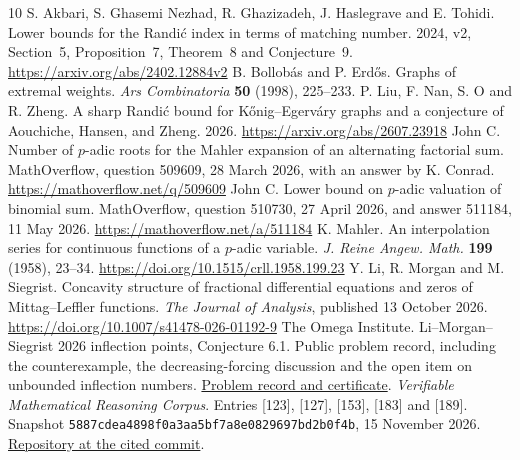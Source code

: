 \documentclass[11pt]{article}
\theoremstyle{remark}\newtheorem{remark}[theorem]{Remark}
\begin{document}
\begin{thebibliography}{10}\small
{} S. Akbari, S. Ghasemi Nezhad, R. Ghazizadeh, J. Haslegrave and E. Tohidi. Lower bounds for the Randi\'c index in terms of matching number. 2024, v2, Section~5, Proposition~7, Theorem~8 and Conjecture~9. \url{https://arxiv.org/abs/2402.12884v2}
 B. Bollob\'as and P. Erd\H{o}s. Graphs of extremal weights. \emph{Ars Combinatoria} \textbf{50} (1998), 225--233.
 P. Liu, F. Nan, S. O and R. Zheng. A sharp Randi\'c bound for K\H{o}nig--Egerv\'ary graphs and a conjecture of Aouchiche, Hansen, and Zheng. 2026. \url{https://arxiv.org/abs/2607.23918}
 John C. Number of $p$-adic roots for the Mahler expansion of an alternating factorial sum. MathOverflow, question 509609, 28 March 2026, with an answer by K. Conrad. \url{https://mathoverflow.net/q/509609}
 John C. Lower bound on $p$-adic valuation of binomial sum. MathOverflow, question 510730, 27 April 2026, and answer 511184, 11 May 2026. \url{https://mathoverflow.net/a/511184}
 K. Mahler. An interpolation series for continuous functions of a $p$-adic variable. \emph{J. Reine Angew. Math.} \textbf{199} (1958), 23--34. \url{https://doi.org/10.1515/crll.1958.199.23}
 Y. Li, R. Morgan and M. Siegrist. Concavity structure of fractional differential equations and zeros of Mittag--Leffler functions. \emph{The Journal of Analysis}, published 13 October 2026. \url{https://doi.org/10.1007/s41478-026-01192-9}
 The Omega Institute. Li--Morgan--Siegrist 2026 inflection points, Conjecture 6.1. Public problem record, including the counterexample, the decreasing-forcing discussion and the open item on unbounded inflection numbers. \href{https://www.trureturing.org/research/li-morgan-siegrist-2026-inflection-points-conjecture-6-1/}{Problem record and certificate}.
 \emph{Verifiable Mathematical Reasoning Corpus}. Entries [123], [127], [153], [183] and [189]. Snapshot \texttt{5887cdea4898f0a3aa5bf7a8e0829697bd2b0f4b}, 15 November 2026. \href{https://github.com/QEEDDD/Verifiable-Mathematical-Reasoning-Corpus/tree/5887cdea4898f0a3aa5bf7a8e0829697bd2b0f4b}{Repository at the cited commit}.
\end{thebibliography}
\end{document}
